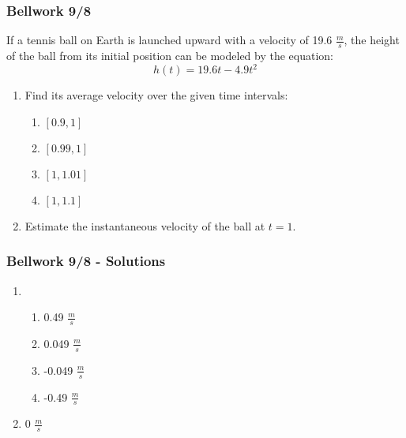 \documentclass[12pt]{beamer}
\begin{document}
\begin{frame}
	\frametitle{Bellwork 9/8}
	\vspace*{\fill}
	\initclock
	\quad If a tennis ball on Earth is launched upward with a velocity of 19.6 $\tfrac{m}{s}$, the height of the ball from its initial position can be modeled by the equation: \[h(t)=19.6t-4.9t^2\]
	\begin{enumerate}
		\item Find its average velocity over the given time intervals:
		      \begin{multicols}{4}
			      \begin{enumerate}
				      \item $[0.9, 1]$
				      \item $[0.99, 1]$
				      \item $[1, 1.01]$
				      \item $[1, 1.1]$
			      \end{enumerate}
		      \end{multicols}
		      \vspace*{\fill}
		\item Estimate the instantaneous velocity of the ball at $t=1$.
	\end{enumerate}
	\vspace*{\fill}
	\vspace*{\fill}
	\crono
\end{frame}
\begin{frame}
	\frametitle{Bellwork 9/8 - Solutions}
	\vspace*{\fill}
	\vspace*{\fill}
	\begin{enumerate}
		\item ~ %
		      \begin{multicols}{2}
			      \begin{enumerate}
				      \item 0.49 $\tfrac{m}{s}$
				      \item 0.049 $\tfrac{m}{s}$
				      \item -0.049 $\tfrac{m}{s}$
				      \item -0.49 $\tfrac{m}{s}$
			      \end{enumerate}
		      \end{multicols}
		      \vspace*{\fill}
		\item 0 $\tfrac{m}{s}$
	\end{enumerate}
	\vspace*{\fill}
	\vspace*{\fill}
\end{frame}
\end{document}
